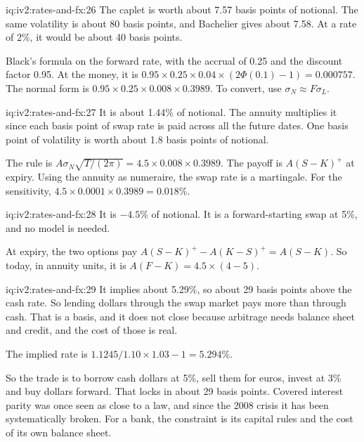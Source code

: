 \begin{solution}{iq:iv2:rates-and-fx:26}
The caplet is worth about 7.57 basis points of notional. The same volatility is about 80 basis points, and Bachelier gives about 7.58. At a rate of 2\%, it would be about 40 basis points.

Black's formula on the forward rate, with the accrual of 0.25 and the discount factor 0.95. At the money, it is $0.95 \times 0.25 \times 0.04 \times (2\Phi(0.1) - 1) = 0.000757$. The normal form is $0.95 \times 0.25 \times 0.008 \times 0.3989$. To convert, use $\sigma_N \approx F\sigma_L$.

\end{solution}

\begin{solution}{iq:iv2:rates-and-fx:27}
It is about 1.44\% of notional. The annuity multiplies it since each basis point of swap rate is paid across all the future dates. One basis point of volatility is worth about 1.8 basis points of notional.

The rule is $A\sigma_N\sqrt{T/(2\pi)} = 4.5 \times 0.008 \times 0.3989$. The payoff is $A(S - K)^+$ at expiry. Using the annuity as numeraire, the swap rate is a martingale. For the sensitivity, $4.5 \times 0.0001 \times 0.3989 = 0.018\%$.

\end{solution}

\begin{solution}{iq:iv2:rates-and-fx:28}
It is $-4.5\%$ of notional. It is a forward-starting swap at 5\%, and no model is needed.

At expiry, the two options pay $A(S - K)^+ - A(K - S)^+ = A(S - K)$. So today, in annuity units, it is $A(F - K) = 4.5 \times (4 - 5)$.

\end{solution}

\begin{solution}{iq:iv2:rates-and-fx:29}
It implies about 5.29\%, so about 29 basis points above the cash rate. So lending dollars through the swap market pays more than through cash. That is a basis, and it does not close because arbitrage needs balance sheet and credit, and the cost of those is real.

The implied rate is $1.1245/1.10 \times 1.03 - 1 = 5.294\%$.

So the trade is to borrow cash dollars at 5\%, sell them for euros, invest at 3\% and buy dollars forward. That locks in about 29 basis points. Covered interest parity was once seen as close to a law, and since the 2008 crisis it has been systematically broken. For a bank, the constraint is its capital rules and the cost of its own balance sheet.

\end{solution}

